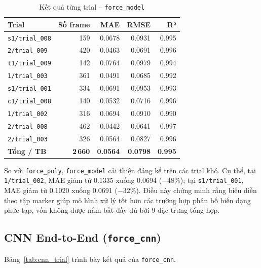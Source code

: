\begin{table}[h]
\centering
\caption{Kết quả từng trial -- \texttt{force\_model}}
\label{tab:model_trial}
\begin{tabular}{lrrrr}
\toprule
\textbf{Trial} & \textbf{Số frame} & \textbf{MAE} & \textbf{RMSE} & \textbf{R²} \\
\midrule
\texttt{s1/trial\_008} & 159 & 0.0678 & 0.0931 & 0.995 \\
\texttt{2/trial\_009}  & 420 & 0.0463 & 0.0691 & 0.996 \\
\texttt{t1/trial\_009} & 142 & 0.0764 & 0.0979 & 0.994 \\
\texttt{1/trial\_003}  & 361 & 0.0491 & 0.0685 & 0.992 \\
\texttt{s1/trial\_001} & 334 & 0.0691 & 0.0953 & 0.993 \\
\texttt{c1/trial\_008} & 140 & 0.0532 & 0.0716 & 0.996 \\
\texttt{1/trial\_002}  & 316 & 0.0694 & 0.0910 & 0.990 \\
\texttt{2/trial\_008}  & 462 & 0.0442 & 0.0641 & 0.997 \\
\texttt{2/trial\_003}  & 326 & 0.0564 & 0.0827 & 0.996 \\
\midrule
\textbf{Tổng / TB} & \textbf{2\,660} & \textbf{0.0564} & \textbf{0.0798} & \textbf{0.995} \\
\bottomrule
\end{tabular}
\end{table}

So với \texttt{force\_poly}, \texttt{force\_model} cải thiện đáng kể trên
các trial khó. Cụ thể, tại \texttt{1/trial\_002}, MAE giảm từ 0.1335 xuống
0.0694 ($-$48\%); tại \texttt{s1/trial\_001}, MAE giảm từ 0.1020 xuống
0.0691 ($-$32\%). Điều này chứng minh rằng biểu diễn theo tập marker giúp
mô hình xử lý tốt hơn các trường hợp phân bố biến dạng phức tạp, vốn không
được nắm bắt đầy đủ bởi 9 đặc trưng tổng hợp.

\subsection{CNN End-to-End (\texttt{force\_cnn})}

Bảng~\ref{tab:cnn_trial} trình bày kết quả của \texttt{force\_cnn}.

